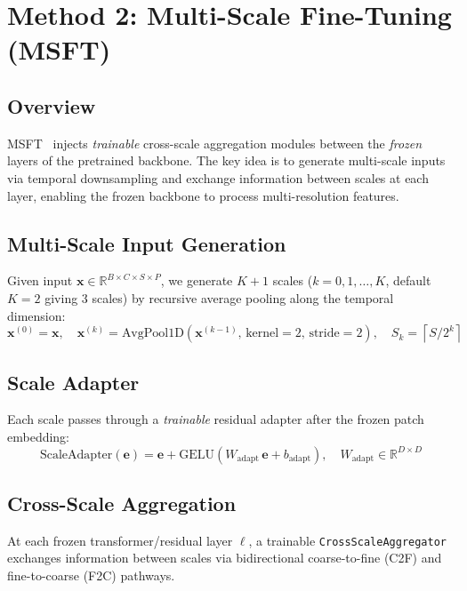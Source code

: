\documentclass{article}
\newcommand{\R}{\mathbb{R}}
\newcommand{\bx}{\bm{x}}
\begin{document}
\section{Method 2: Multi-Scale Fine-Tuning (MSFT)}
\label{sec:msft}

\subsection{Overview}
MSFT~\cite{qiao2025msft} injects \emph{trainable} cross-scale aggregation modules between the \emph{frozen} layers of the pretrained backbone.
The key idea is to generate multi-scale inputs via temporal downsampling and exchange information between scales at each layer, enabling the frozen backbone to process multi-resolution features.

\subsection{Multi-Scale Input Generation}

Given input $\bx \in \R^{B \times C \times S \times P}$, we generate $K+1$ scales ($k = 0, 1, \ldots, K$, default $K=2$ giving 3 scales) by recursive average pooling along the temporal dimension:
\begin{equation}
\bx^{(0)} = \bx, \quad
\bx^{(k)} = \text{AvgPool1D}\!\left(\bx^{(k-1)},\, \text{kernel}=2,\, \text{stride}=2\right), \quad
S_k = \left\lceil S / 2^k \right\rceil
\end{equation}

\subsection{Scale Adapter}

Each scale passes through a \emph{trainable} residual adapter after the frozen patch embedding:
\begin{equation}
\text{ScaleAdapter}(\bm{e}) = \bm{e} + \text{GELU}(W_\text{adapt}\, \bm{e} + b_\text{adapt}), \quad W_\text{adapt} \in \R^{D \times D}
\end{equation}

\subsection{Cross-Scale Aggregation}

At each frozen transformer/residual layer $\ell$, a trainable \texttt{CrossScaleAggregator} exchanges information between scales via bidirectional coarse-to-fine (C2F) and fine-to-coarse (F2C) pathways.
\end{document}
